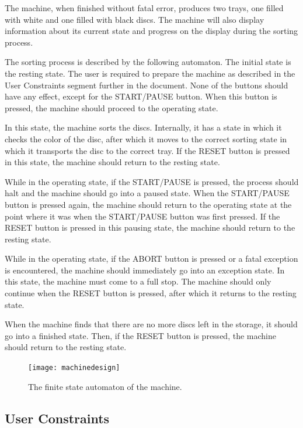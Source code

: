 \documentclass[a4paper,oneside,11pt]{article}
\begin{document}
The machine, when finished without fatal error, produces two trays, one filled with white and one filled with black discs. The machine will also display information about its current state and progress on the display during the sorting process.

The sorting process is described by the following automaton. The initial state is the resting state. The user is required to prepare the machine as described in the User Constraints segment further in the document. None of the buttons should have any effect, except for the START/PAUSE button. When this button is pressed, the machine should proceed to the operating state.

In this state, the machine sorts the discs. Internally, it has a state in which it checks the color of the disc, after which it moves to the correct sorting state in which it transports the disc to the correct tray. If the RESET button is pressed in this state, the machine should return to the resting state.

While in the operating state, if the START/PAUSE is pressed, the process should halt and the machine should go into a paused state. When the START/PAUSE button is pressed again, the machine should return to the operating state at the point where it was when the START/PAUSE button was first pressed. If the RESET button is pressed in this pausing state, the machine should return to the resting state.

While in the operating state, if the ABORT button is pressed or a fatal exception is encountered, the machine should immediately go into an exception state. In this state, the machine must come to a full stop. The machine should only continue when the RESET button is pressed, after which it returns to the resting state.

When the machine finds that there are no more discs left in the storage, it should go into a finished state. Then, if the RESET button is pressed, the machine should return to the resting state.

\begin{figure}[H]
	\centering
	\texttt{[image: machinedesign]}
	\caption{\label{machinedesign}The finite state automaton of the machine.}
\end{figure}

\subsection{User Constraints}
\end{document}
